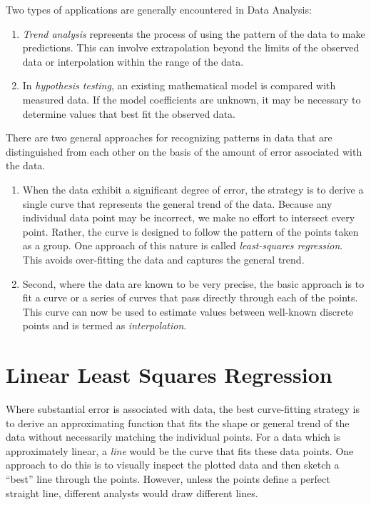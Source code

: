 \documentclass[book.tex]{subfiles}
\begin{document}
Two types of applications are generally encountered in Data Analysis:
\begin{enumerate}
	\item\textit{Trend analysis} represents the process of using the pattern of the data to make predictions. This can involve extrapolation beyond the limits of the observed data or interpolation within the range of the data.
	\item In \textit{hypothesis testing}, an existing mathematical model is compared with measured data. If the model coefficients are unknown, it may be necessary to determine values that best fit the observed data.
\end{enumerate}
There are two general approaches for recognizing patterns in data that are distinguished from each other on the basis of the amount of error associated with the data. 
\begin{enumerate}
\item When the data exhibit a significant degree of error, the strategy is to derive a single curve that represents the general trend of the data. Because any individual data point may be incorrect, we make no effort to intersect every point. Rather, the curve is designed to follow the pattern of the points taken as a group. One approach of this nature is called \textit{least-squares regression}. This avoids over-fitting the data and captures the general trend.
\item Second, where the data are known to be very precise, the basic approach is to fit a curve or a series of curves that pass directly through each of the points. This curve can now be used to estimate values between well-known discrete points and is termed as \textit{interpolation}.
\end{enumerate}

\section{Linear Least Squares Regression}
Where substantial error is associated with data, the best curve-fitting strategy is to derive
an approximating function that fits the shape or general trend of the data without necessarily
matching the individual points. For a data which is approximately linear, a \textit{line} would be the curve that fits these data points. One approach to do this is to visually inspect the plotted data and then sketch a \textquotedblleft best\textquotedblright \hspace{2pt} line through the points. However, unless the points define a perfect straight line, different analysts would draw different lines.
\end{document}
